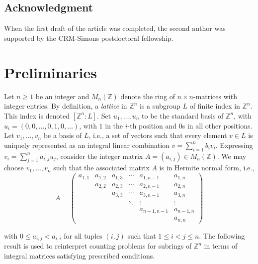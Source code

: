 \documentclass[a4paper]{amsart}
\numberwithin{equation}{section}
\theoremstyle{remark}
\newcommand{\Z}{\mathbb{Z}}
\begin{document}
\subsection*{Acknowledgment} When the first draft of the article was completed, the second author was supported by the CRM-Simons postdoctoral fellowship.


\section{Preliminaries}\label{s 2}
\par Let $n\geq 1$ be an integer and $M_n(\Z)$ denote the ring of $n\times n$-matrices with integer entries. By definition, a \emph{lattice} in $\Z^n$ is a subgroup $L$ of finite index in $\Z^n$. This index is denoted $[\Z^n:L]$. Set $u_1, \dots, u_n$ to be the standard basis of $\Z^n$, with $u_i=(0,0,\dots, 0,1,0,\dots)$, with $1$ in the $i$-th position and $0$s in all other positions. Let $v_1,\dots, v_n$ be a basis of $L$, i.e., a set of vectors such that every element $v\in L$ is uniquely represented as an integral linear combination $v=\sum_{i=1}^n b_i v_i$. Expressing $v_i=\sum_{j=1}^n a_{i,j} u_j$, consider the integer matrix $A=\left(a_{i,j}\right)\in M_n(\Z)$. We may choose $v_1,\dots, v_n$ such that the associated matrix $A$ is in Hermite normal form, i.e.,
\[A=\begin{pmatrix}
	a_{1,1} & a_{1,2} & a_{1,3} & \cdots & a_{1,n-1}& a_{1,n} \\
	& a_{2,2} & a_{2,3} & \cdots & a_{2,n-1} & a_{2,n}\\
	&& a_{3,3} & \cdots & a_{3,n-1} & a_{3,n}\\
	&&& \ddots & \vdots& \vdots\\
	&&&& a_{n-1,n-1} & a_{n-1,n}\\
	&&&&& a_{n, n}
	\end{pmatrix}\]
	
	with $0\leq a_{i,j}< a_{i,i}$ for all tuples $(i,j)$ such that $1\leq i<j\leq n$. The following result is used to reinterpret counting problems for subrings of $\Z^n$ in terms of integral matrices satisfying prescribed conditions. 
	
\end{document}
